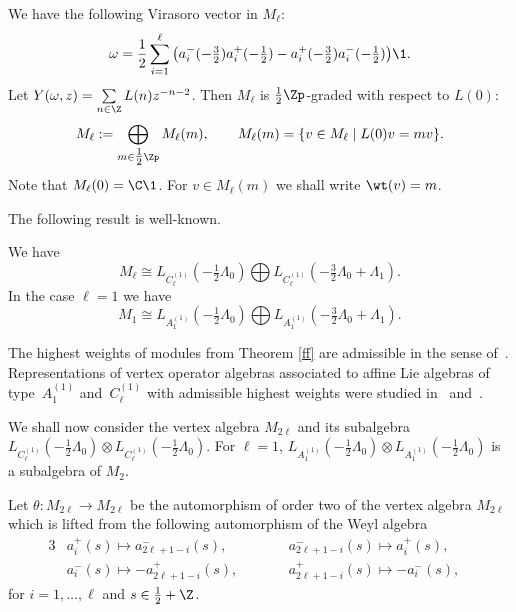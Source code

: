 \documentclass[pdftex]{sigma}
\begin{document}
We have the following Virasoro vector in $M_{\ell}$:
\begin{gather} \label{vir-bos}  \omega=\frac{1}{2} \sum_{i=1} ^{\ell} \big( a_i
^-  (- \tfrac{3}{2} ) a_i ^{+}  (-\tfrac{1}{2}  ) -a_i ^+  (-  \tfrac{3}{2} )
a_i ^{-} (-\tfrac{1}{2}  ) \big) {\1}.
\end{gather}
Let $Y(\omega,z) = \sum\limits_{n \in {\Z} } L(n) z ^{-n-2}$.
Then $M_{\ell}$ is $\tfrac{1}{2}{\Zp}$-graded with respect to
$L(0)$:
\[ M_{\ell} := \bigoplus_{ m \in \tfrac{1}{2} \Zp} M_{\ell} (m),
\qquad M_{\ell} (m)= \{ v \in M_{\ell} \; \vert \;  L(0) v = m v \}.\]
Note that $M_{\ell} (0) = {\C} {\1}$. For $ v \in M_{\ell} (m)$ we
shall write $\wt (v) = m$.

The following result is well-known.

\begin{theorem}[\cite{FF}] \label{ff}
We have
\[  M_{\ell} \cong L_{C_{\ell} ^{(1)}}( -\tfrac{1}{2}\Lambda _{0})
\bigoplus L_{C_{\ell} ^{(1)}}( -\tfrac{3}{2}\Lambda _{0} +
\Lambda_1). \]
In the case $\ell =1$ we have \[  M_1 \cong L_{A_1 ^{(1)}}(
-\tfrac{1}{2}\Lambda _{0}) \bigoplus L_{A_1 ^{(1)}}(
-\tfrac{3}{2}\Lambda _{0} + \Lambda_1). \]
\end{theorem}

\begin{remark} The highest weights of modules from Theorem \ref{ff}
are admissible in the sense of~\cite{KW}. Representations of vertex
operator algebras associated to af\/f\/ine Lie algebras of type~$A_1
^{(1)}$ and~$C_{\ell} ^{(1)}$ with admissible highest weights were
studied in~\cite{AM} and~\cite{A-1994}.
\end{remark}

We shall now consider the vertex algebra $M_{2 \ell}$ and its
subalgebra $L_{C_{\ell} ^{(1)}}( -\tfrac{1}{2}\Lambda _{0}) \otimes
L_{C_{\ell} ^{(1)}}( -\tfrac{1}{2}\Lambda _{0})$. For $\ell =1$,
$L_{A_1 ^{(1)}}(-\tfrac{1}{2}\Lambda_0) \otimes L_{A_1
^{(1)}}(-\tfrac{1}{2}\Lambda_0)$ is a subalgebra of $M_{2}$.





Let $\theta : M_{2 \ell} \rightarrow M_{2 \ell}$ be the automorphism
of order two of  the vertex algebra $M_{2 \ell}$ which is lifted
from the following automorphism of the Weyl algebra
\begin{alignat*}{3}
& a_{i} ^+ (s) \mapsto  a_{2\ell+1-i} ^{-} (s), \qquad
&& a_{2\ell+1-i} ^- (s) \mapsto  a_{i} ^{+} (s), &  \\
& a_{i} ^-(s) \mapsto - a_{2\ell+1-i} ^+ (s), \qquad && a_{2\ell+1-i}
^+(s) \mapsto - a_{i} ^- (s), &
 \end{alignat*}
for $i =1, \dots, \ell$ and  $s \in \tfrac{1}{2} + {\Z}$.
\end{document}
